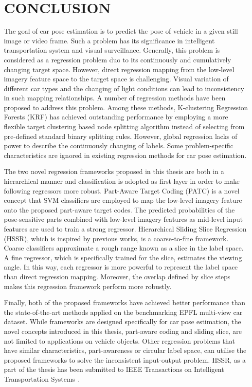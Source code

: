 \documentclass{tutmscthesis}[2010/09/22]
\numberwithin{equation}{section}
\numberwithin{table}{section}
\numberwithin{figure}{section}
\begin{document}
\section{CONCLUSION}\label{sec:conclusion}
The goal of car pose estimation is to predict the pose of vehicle in a given still image or video frame. 
Such a problem has its significance in intelligent transportation system and visual surveillance. 
Generally, this problem is considered as a regression problem duo to its continuously and cumulatively changing target space. 
However, direct regression mapping from the low-level imagery feature space to the target space is challenging.
Visual variation of different car types and the changing of light conditions can lead to inconsistency in such mapping relationships.
A number of regression methods have been proposed to address this problem.
Among these methods, K-clustering Regression Forests (KRF) has achieved outstanding performance by employing a more flexible target clustering based node splitting algorithm instead of selecting from pre-defined standard binary splitting rules. 
However, global regression lacks of power to describe the continuously changing of labels.
Some problem-specific characteristics are ignored in existing regression methods for car pose estimation.  

The two novel regression frameworks proposed in this thesis are both in a hierarchical manner and classification is adopted as first layer in order to make following regressors more robust.
Part-Aware Target Coding (PATC) is a novel concept that SVM classifiers are employed to map the low-level imagery feature onto the proposed part-aware target codes.
The predicted probabilities of the pose-sensitive parts combined with low-level imagery features as mid-level input features are used to train a strong regressor.
Hierarchical Sliding Slice Regression (HSSR), which is inspired by previous works, is a coarse-to-fine framework.
Coarse classifiers approximate a rough range known as a slice in the label space.
A fine regressor, which is specifically trained for the slice, estimates the viewing angle.
In this way, each regressor is more powerful to represent the label space than direct regression mapping.
Moreover, the overlap defined by slice steps makes this regression framework perform more robustly.

Finally, both of the proposed frameworks have achieved better performance than the state-of-the-art methods applied on the benchmarking EPFL multi-view car dataset.
While frameworks are designed specifically for car pose estimation, the novel concepts introduced in this thesis, part-aware coding and sliding slice,  are not limited to applications on vehicle objects.
Other regression problems that have similar characteristics, part-awareness or circular label space, can utilise the proposed frameworks to solve the inconsistent input-output problem. 
HSSR, as a part of the thesis has been submitted to IEEE Transactions on Intelligent Transportation Systems \cite{dan2017hssr}.
\end{document}
